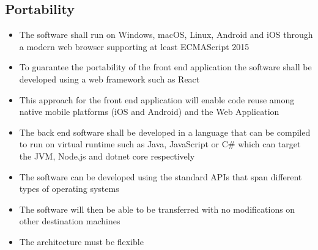 \subsection{Portability}
\begin{itemize}
  \item The software shall run on Windows, macOS, Linux, Android and iOS through a modern web browser supporting at least ECMAScript 2015
  \item To guarantee the portability of the front end application the software shall be developed using a web framework such as React
  \item This approach for the front end application will enable code reuse among native mobile platforms (iOS and Android) and the Web Application
  \item The back end software shall be developed in a language that can be compiled to run on virtual runtime such as Java, JavaScript or C\# which can target the JVM, Node.js and dotnet core respectively
  \item The software can be developed using the standard APIs that span different types of operating systems
  \item The software will then be able to be transferred with no modifications on other destination machines
  \item The architecture must be flexible
\end{itemize}
